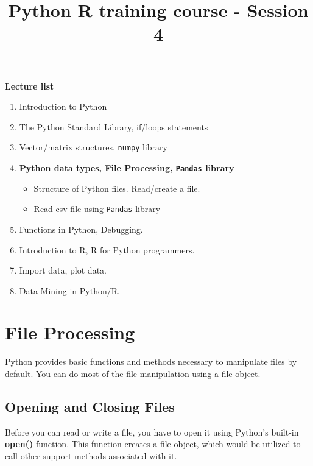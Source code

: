 \documentclass[11pt]{article}
\title{Python R training course - Session 4}
\providecommand{\tightlist}{%
      \setlength{\itemsep}{0pt}\setlength{\parskip}{0pt}}
\begin{document}
    
    
    \maketitle
    
    

    
    \textbf{Lecture list}

\begin{enumerate}
\def\labelenumi{\arabic{enumi}.}
\item
  Introduction to Python
\item
  The Python Standard Library, if/loops statements
\item
  Vector/matrix structures, \texttt{numpy} library
\item
  \textbf{Python data types, File Processing, \texttt{Pandas} library}

  \begin{itemize}
  \tightlist
  \item
    Structure of Python files. Read/create a file.
  \item
    Read csv file using \texttt{Pandas} library
  \end{itemize}
\item
  Functions in Python, Debugging.
\item
  Introduction to R, R for Python programmers.
\item
  Import data, plot data.
\item
  Data Mining in Python/R.
\end{enumerate}

    \section{File Processing}\label{file-processing}

Python provides basic functions and methods necessary to manipulate
files by default. You can do most of the file manipulation using a file
object.

\subsection{Opening and Closing Files}\label{opening-and-closing-files}

Before you can read or write a file, you have to open it using Python's
built-in \textbf{open()} function. This function creates a file object,
which would be utilized to call other support methods associated with
it.
\end{document}
